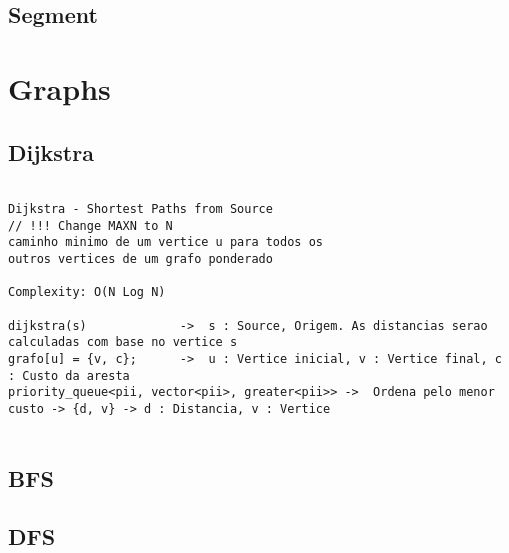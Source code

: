 \vspace{-2pt}
\subsection{Segment}
\vspace{-5pt}
\raggedbottom
\hrulefill


\section{Graphs}
\vspace{-2pt}
\subsection{Dijkstra}
\vspace{-4pt}
\begin{lstlisting}[style=description]

Dijkstra - Shortest Paths from Source
// !!! Change MAXN to N
caminho minimo de um vertice u para todos os
outros vertices de um grafo ponderado

Complexity: O(N Log N)

dijkstra(s)				->  s : Source, Origem. As distancias serao calculadas com base no vertice s
grafo[u] = {v, c};  	->  u : Vertice inicial, v : Vertice final, c : Custo da aresta
priority_queue<pii, vector<pii>, greater<pii>> ->  Ordena pelo menor custo -> {d, v} -> d : Distancia, v : Vertice


\end{lstlisting}
\vspace{-5pt}
\raggedbottom
\hrulefill

\vspace{-2pt}
\subsection{BFS}
\vspace{-5pt}
\raggedbottom
\hrulefill

\vspace{-2pt}
\subsection{DFS}
\vspace{-5pt}
\raggedbottom
\hrulefill

